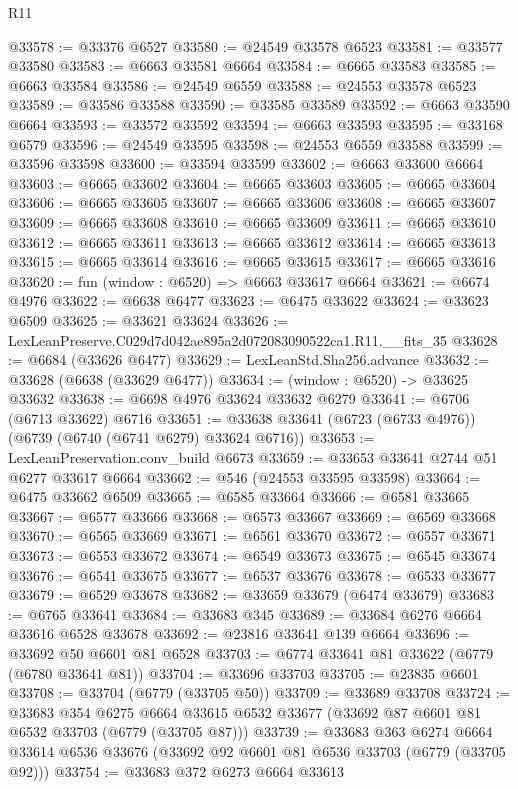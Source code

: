\begin{lexlean}{R11}
\begin{coremodule}
@33578 := @33376 @6527
@33580 := @24549 @33578 @6523
@33581 := @33577 @33580
@33583 := @6663 @33581 @6664
@33584 := @6665 @33583
@33585 := @6663 @33584
@33586 := @24549 @6559
@33588 := @24553 @33578 @6523
@33589 := @33586 @33588
@33590 := @33585 @33589
@33592 := @6663 @33590 @6664
@33593 := @33572 @33592
@33594 := @6663 @33593
@33595 := @33168 @6579
@33596 := @24549 @33595
@33598 := @24553 @6559 @33588
@33599 := @33596 @33598
@33600 := @33594 @33599
@33602 := @6663 @33600 @6664
@33603 := @6665 @33602
@33604 := @6665 @33603
@33605 := @6665 @33604
@33606 := @6665 @33605
@33607 := @6665 @33606
@33608 := @6665 @33607
@33609 := @6665 @33608
@33610 := @6665 @33609
@33611 := @6665 @33610
@33612 := @6665 @33611
@33613 := @6665 @33612
@33614 := @6665 @33613
@33615 := @6665 @33614
@33616 := @6665 @33615
@33617 := @6665 @33616
@33620 := fun (window : @6520) => @6663 @33617 @6664
@33621 := @6674 @4976
@33622 := @6638 @6477
@33623 := @6475 @33622
@33624 := @33623 @6509
@33625 := @33621 @33624
@33626 := LexLeanPreserve.C029d7d042ae895a2d072083090522ca1.R11.__fits_35
@33628 := @6684 (@33626 @6477)
@33629 := LexLeanStd.Sha256.advance
@33632 := @33628 (@6638 (@33629 @6477))
@33634 := (window : @6520) -> @33625 @33632
@33638 := @6698 @4976 @33624 @33632 @6279
@33641 := @6706 (@6713 @33622) @6716
@33651 := @33638 @33641 (@6723 (@6733 @4976)) (@6739 (@6740 (@6741 @6279) @33624 @6716))
@33653 := LexLeanPreservation.conv_build @6673
@33659 := @33653 @33641 @2744 @51 @6277 @33617 @6664
@33662 := @546 (@24553 @33595 @33598)
@33664 := @6475 @33662 @6509
@33665 := @6585 @33664
@33666 := @6581 @33665
@33667 := @6577 @33666
@33668 := @6573 @33667
@33669 := @6569 @33668
@33670 := @6565 @33669
@33671 := @6561 @33670
@33672 := @6557 @33671
@33673 := @6553 @33672
@33674 := @6549 @33673
@33675 := @6545 @33674
@33676 := @6541 @33675
@33677 := @6537 @33676
@33678 := @6533 @33677
@33679 := @6529 @33678
@33682 := @33659 @33679 (@6474 @33679)
@33683 := @6765 @33641
@33684 := @33683 @345
@33689 := @33684 @6276 @6664 @33616 @6528 @33678
@33692 := @23816 @33641 @139 @6664
@33696 := @33692 @50 @6601 @81 @6528
@33703 := @6774 @33641 @81 @33622 (@6779 (@6780 @33641 @81))
@33704 := @33696 @33703
@33705 := @23835 @6601
@33708 := @33704 (@6779 (@33705 @50))
@33709 := @33689 @33708
@33724 := @33683
    @354
    @6275
    @6664
    @33615
    @6532
    @33677
    (@33692 @87 @6601 @81 @6532 @33703 (@6779 (@33705 @87)))
@33739 := @33683
    @363
    @6274
    @6664
    @33614
    @6536
    @33676
    (@33692 @92 @6601 @81 @6536 @33703 (@6779 (@33705 @92)))
@33754 := @33683
    @372
    @6273
    @6664
    @33613

\end{coremodule}
\end{lexlean}
